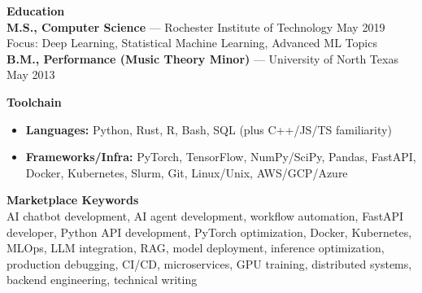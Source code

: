 \documentclass[10.5pt]{res}
\begin{document}
\begin{resume}
{\bf Education} \\
\textbf{M.S., Computer Science} --- Rochester Institute of Technology \hfill May 2019\\
Focus: Deep Learning, Statistical Machine Learning, Advanced ML Topics\\[0.15cm]
\textbf{B.M., Performance (Music Theory Minor)} --- University of North Texas \hfill May 2013
\vspace{.27 cm}

{\bf Toolchain} \\
\begin{itemize}
    \item \textbf{Languages:} Python, Rust, R, Bash, SQL (plus C++/JS/TS familiarity)
    \item \textbf{Frameworks/Infra:} PyTorch, TensorFlow, NumPy/SciPy, Pandas, FastAPI, Docker, Kubernetes, Slurm, Git, Linux/Unix, AWS/GCP/Azure
\end{itemize}

{\bf Marketplace Keywords} \\
{\small AI chatbot development, AI agent development, workflow automation, FastAPI developer, Python API development, PyTorch optimization, Docker, Kubernetes, MLOps, LLM integration, RAG, model deployment, inference optimization, production debugging, CI/CD, microservices, GPU training, distributed systems, backend engineering, technical writing}

\end{resume} 
\end{document}
